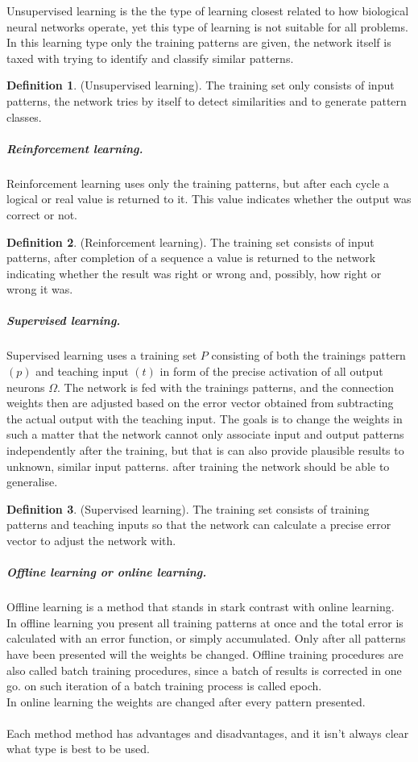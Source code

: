 \documentclass[pdftex,a4paper,12pt,twoside]{report}
\theoremstyle{plain} \newtheorem{theorem}{Theorem} \newtheorem{proposition}{Proposition} \newtheorem{lemma}{Lemma} \newtheorem*{corollary}{Corollary}
\theoremstyle{definition} \newtheorem{definition}{Definition} \newtheorem{conjecture}{Conjecture} \newtheorem*{example}{Example} \newtheorem{algorithm}{Algorithm}
\theoremstyle{remark} \newtheorem*{remark}{Remark} \newtheorem*{note}{Note} \newtheorem{case}{Case}
\begin{document}
Unsupervised learning is the the type of learning closest related to how biological neural networks operate, yet this type of learning is not suitable for all problems. In this learning type only the training patterns are given, the network itself is taxed with trying to identify and classify similar patterns.
\begin{definition}(Unsupervised learning). The training set only consists of input
patterns, the network tries by itself to detect similarities and to generate pattern
classes.
\end{definition}
\subparagraph{Reinforcement learning.}
Reinforcement learning uses only the training patterns, but after each cycle a logical or real value is returned to it. This value indicates whether the output was correct or not.
\begin{definition}
(Reinforcement learning). The training set consists of input patterns,
after completion of a sequence a value is returned to the network indicating whether
the result was right or wrong and, possibly, how right or wrong it was.
\end{definition}
\subparagraph{Supervised learning.}
Supervised learning uses a training set $P$ consisting of both the trainings pattern $(p)$ and teaching input $(t)$ in form of the precise activation of all output neurons $\Omega$. The network is fed with the trainings patterns, and the connection weights then are adjusted based on the error vector obtained from subtracting the actual output with the teaching input. The goals is to change the weights in such a matter that the network cannot only associate input and output patterns independently after the training, but that is can also provide plausible results to unknown, similar input patterns. after training the network should be able to generalise.
\begin{definition}
(Supervised learning). The training set consists of training patterns and teaching inputs so that the network can calculate a precise error vector to adjust the network with.
\end{definition}
\subparagraph{Offline learning or online learning.}
Offline learning is a method that stands in stark contrast with online learning.\\In offline learning you present all training patterns at once and the total error is calculated with an error function, or simply accumulated. Only after all patterns have been presented will the weights be changed. Offline training procedures are also called batch training procedures, since a batch of results is corrected in one go. on such iteration of a batch training process is called  epoch.\\In online learning the weights are changed after every pattern presented.\\\\Each method method has advantages and disadvantages, and it isn't always clear what type is best to be used. 
\end{document}
